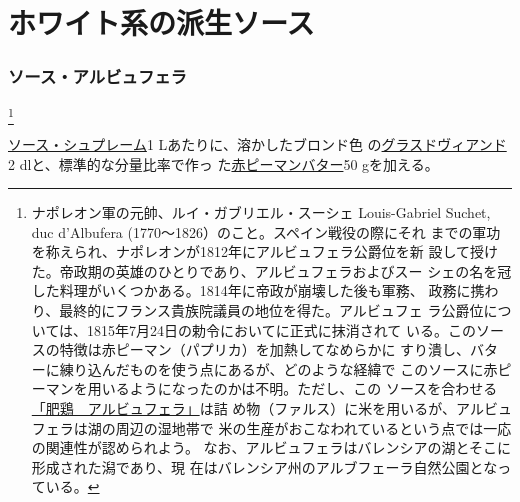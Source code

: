 \hypertarget{petites-sauces-blanches}{%
\section{ホワイト系の派生ソース}\label{petites-sauces-blanches}}


\begin{recette}
\hypertarget{sauce-albufera}{%
\subsubsection{ソース・アルビュフェラ}\label{sauce-albufera}}

\footnote{ナポレオン軍の元帥、ルイ・ガブリエル・スーシェ
  Louis-Gabriel Suchet, duc d'Albufera
  (1770〜1826）のこと。スペイン戦役の際にそれ
  までの軍功を称えられ、ナポレオンが1812年にアルビュフェラ公爵位を新
  設して授けた。帝政期の英雄のひとりであり、アルビュフェラおよびスー
  シェの名を冠した料理がいくつかある。1814年に帝政が崩壊した後も軍務、
  政務に携わり、最終的にフランス貴族院議員の地位を得た。アルビュフェ
  ラ公爵位については、1815年7月24日の勅令においてに正式に抹消されて
  いる。このソースの特徴は赤ピーマン（パプリカ）を加熱してなめらかに
  すり潰し、バターに練り込んだものを使う点にあるが、どのような経緯で
  このソースに赤ピーマンを用いるようになったのかは不明。ただし、この
  ソースを合わせる\protect\hyperlink{poularde-albufera}{「肥鶏　アルビュフェラ」}は詰
  め物（ファルス）に米を用いるが、アルビュフェラは湖の周辺の湿地帯で
  米の生産がおこなわれているという点では一応の関連性が認められよう。
  なお、アルビュフェラはバレンシアの湖とそこに形成された潟であり、現
  在はバレンシア州のアルブフェーラ自然公園となっている。}


\protect\hyperlink{sauce-supreme}{ソース・シュプレーム}1
Lあたりに、溶かしたブロンド色
の\protect\hyperlink{glace-de-viande}{グラスドヴィアンド}2
dlと、標準的な分量比率で作っ
た\protect\hyperlink{beurre-de-pimentos}{赤ピーマンバター}50 gを加える。


\end{recette}
